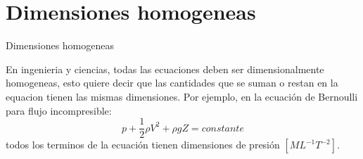 \documentclass [xcolor=svgnames, t] {beamer}
\begin{document}
\section{Dimensiones homogeneas}
\begin{frame}{Dimensiones homogeneas}
\begin{exampleblock}{}
En ingenieria y ciencias, todas las ecuaciones deben ser dimensionalmente homogeneas, esto quiere decir que las cantidades que se suman o restan en la equacion tienen las mismas dimensiones. Por ejemplo, en la ecuaci\'on de Bernoulli para flujo incompresible:
$$
p + \frac{1}{2} \rho V^2 + \rho g Z = constante
$$
todos los terminos de la ecuaci\'on tienen dimensiones de presi\'on $[ML^{-1}T^{-2}]$.
\end{exampleblock}{}
\end{frame}
\end{document}
